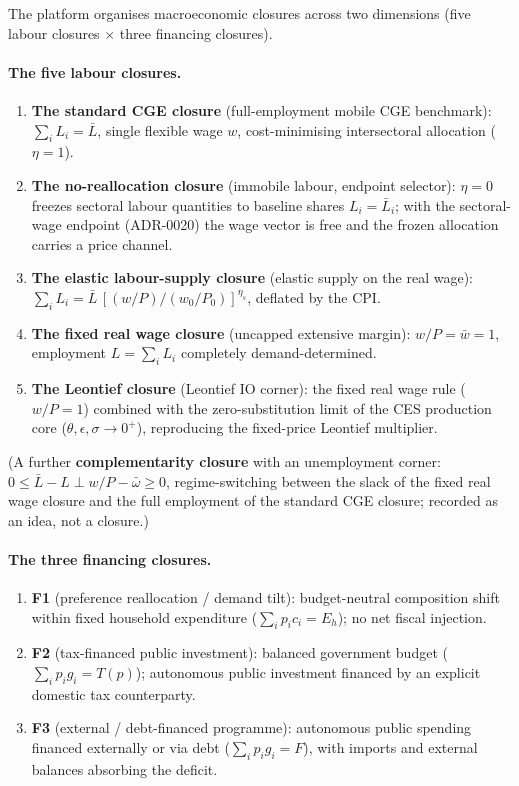 The platform organises macroeconomic closures across two dimensions (five
labour closures $\times$ three financing closures).

\paragraph{The five labour closures.}
\begin{enumerate}
\item \textbf{The standard CGE closure} (full-employment mobile CGE benchmark):
  $\sum_i L_i = \bar L$, single flexible wage $w$, cost-minimising
  intersectoral allocation ($\eta = 1$).
\item \textbf{The no-reallocation closure} (immobile labour, endpoint
  selector): $\eta = 0$ freezes
  sectoral labour quantities to baseline shares $L_i = \bar L_i$; with the
  sectoral-wage endpoint (ADR-0020) the wage vector is free and the frozen
  allocation carries a price channel.
\item \textbf{The elastic labour-supply closure} (elastic supply on the real
  wage):
  $\sum_i L_i = \bar L\,[(w/P)/(w_0/P_0)]^{\eta_s}$, deflated by the CPI.
\item \textbf{The fixed real wage closure} (uncapped extensive margin):
  $w/P = \bar w = 1$, employment $L = \sum_i L_i$ completely
  demand-determined.
\item \textbf{The Leontief closure} (Leontief IO corner): the fixed real
  wage rule ($w/P = 1$) combined with
  the zero-substitution limit of the CES production core
  ($\theta, \epsilon, \sigma \to 0^+$), reproducing the fixed-price Leontief
  multiplier.
\end{enumerate}
(A further \textbf{complementarity closure} with an unemployment corner: $0 \le
\bar L - L \perp w/P -
\bar\omega \ge 0$, regime-switching between the slack of the fixed real
wage closure and the full employment of the standard CGE closure; recorded
as an idea, not a closure.)

\paragraph{The three financing closures.}
\begin{enumerate}
\item \textbf{F1} (preference reallocation / demand tilt): budget-neutral
  composition shift within fixed household expenditure
  ($\sum_i p_i c_i = E_h$); no net fiscal injection.
\item \textbf{F2} (tax-financed public investment): balanced government
  budget ($\sum_i p_i g_i = T(p)$); autonomous public investment financed by
  an explicit domestic tax counterparty.
\item \textbf{F3} (external / debt-financed programme): autonomous public
  spending financed externally or via debt ($\sum_i p_i g_i = F$), with
  imports and external balances absorbing the deficit.
\end{enumerate}

